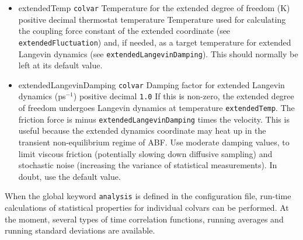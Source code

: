 \begin{itemize}
\item %
  \keydef
    {extendedTemp}{%
    \texttt{colvar}}{%
    Temperature for the extended degree of freedom (K)}{%
    positive decimal}{%
    thermostat temperature}{%
    Temperature used for calculating the coupling force constant of the
    extended coordinate (see \texttt{extendedFluctuation}) and, if needed, as a
    target temperature for extended Langevin dynamics (see
    \texttt{extendedLangevinDamping}). This should normally be left at its
    default value.}

\item %
  \keydef
    {extendedLangevinDamping}{%
    \texttt{colvar}}{%
    Damping factor for extended Langevin dynamics
    (ps$^{-1}$)}{%
    positive decimal}{%
    \texttt{1.0}}{%
    If this is non-zero, the extended degree of freedom undergoes Langevin dynamics
    at temperature \texttt{extendedTemp}. The friction force is minus
    \texttt{extendedLangevinDamping} times the velocity. This is useful because
    the extended dynamics coordinate may heat up in the transient
    non-equilibrium regime of ABF. Use moderate damping values, to limit
    viscous friction (potentially slowing down diffusive sampling) and stochastic
    noise (increasing the variance of statistical measurements). In
    doubt, use the default value.}
\end{itemize}


\label{sec:colvar_acf}

When the global keyword \texttt{analysis} is defined in the
configuration file, run-time calculations of statistical properties for
individual colvars can be performed.  At the moment, several types of
time correlation functions, running averages and running standard
deviations are available.

